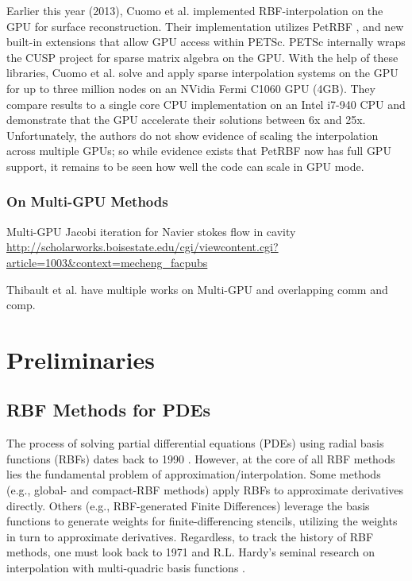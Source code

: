 \documentclass[11pt]{report}
\begin{document}
{Earlier this year (2013), Cuomo et al. \cite{Cuomo2013} implemented RBF-interpolation on the GPU for surface reconstruction. Their implementation utilizes PetRBF \cite{Yokota2010}, and new built-in extensions that allow GPU access within PETSc. PETSc internally wraps the CUSP project \cite{CUSP} for sparse matrix algebra on the GPU. With the help of these libraries, Cuomo et al. solve and apply sparse interpolation systems on the GPU for up to three million nodes on an NVidia Fermi C1060 GPU (4GB). They compare results to a single core CPU implementation on an Intel i7-940 CPU and demonstrate that the GPU accelerate their solutions between 6x and 25x. Unfortunately, the authors do not show evidence of scaling the interpolation across multiple GPUs; so while evidence exists that PetRBF now has full GPU support, it remains to be seen how well the code can scale in GPU mode. 
 
\section{On Multi-GPU Methods}
 
Multi-GPU Jacobi iteration for Navier stokes flow in cavity \url{http://scholarworks.boisestate.edu/cgi/viewcontent.cgi?article=1003&context=mecheng_facpubs}

Thibault et al. have multiple works on Multi-GPU and overlapping comm and comp. 




\part{Preliminaries}


\chapter{RBF Methods for PDEs}
\label{chap:background}

The process of solving partial differential equations (PDEs) using radial basis functions (RBFs) dates back to 1990 \cite{Kansa1990a,Kansa1990b}. However, at the core of all RBF methods lies the fundamental problem of approximation/interpolation. Some methods (e.g., global- and compact-RBF methods) apply RBFs to approximate derivatives directly. Others (e.g., RBF-generated Finite Differences) leverage the basis functions to generate weights for finite-differencing stencils, utilizing the weights in turn to approximate derivatives. Regardless, to track the history of RBF methods, one must look back to 1971 and R.L. Hardy's seminal research on interpolation with multi-quadric basis functions \cite{Hardy1971}. 

}
\end{document}
